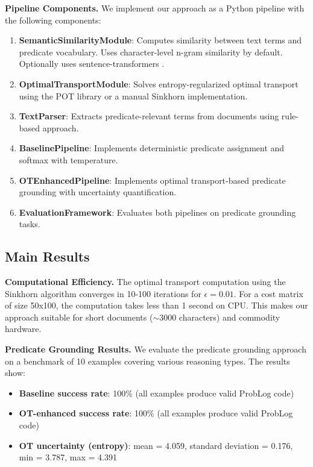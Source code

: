 \documentclass[11pt,letterpaper]{article}
\begin{document}
\textbf{Pipeline Components.} We implement our approach as a Python pipeline with the following components:

\begin{enumerate}
\item \textbf{SemanticSimilarityModule}: Computes similarity between text terms and predicate vocabulary. Uses character-level n-gram similarity by default. Optionally uses sentence-transformers \cite{Reimers2019}.

\item \textbf{OptimalTransportModule}: Solves entropy-regularized optimal transport using the POT library \cite{Flamary2022} or a manual Sinkhorn implementation.

\item \textbf{TextParser}: Extracts predicate-relevant terms from documents using rule-based approach.

\item \textbf{BaselinePipeline}: Implements deterministic predicate assignment and softmax with temperature.

\item \textbf{OTEnhancedPipeline}: Implements optimal transport-based predicate grounding with uncertainty quantification.

\item \textbf{EvaluationFramework}: Evaluates both pipelines on predicate grounding tasks.
\end{enumerate}

\subsection{Main Results}

\textbf{Computational Efficiency.} The optimal transport computation using the Sinkhorn algorithm converges in 10-100 iterations for $\epsilon = 0.01$. For a cost matrix of size 50x100, the computation takes less than 1 second on CPU. This makes our approach suitable for short documents ($\sim$3000 characters) and commodity hardware.

\textbf{Predicate Grounding Results.} We evaluate the predicate grounding approach on a benchmark of 10 examples covering various reasoning types. The results show:

\begin{itemize}[noitemsep]
\item \textbf{Baseline success rate}: 100\% (all examples produce valid ProbLog code)
\item \textbf{OT-enhanced success rate}: 100\% (all examples produce valid ProbLog code)
\item \textbf{OT uncertainty (entropy)}: mean = 4.059, standard deviation = 0.176, min = 3.787, max = 4.391
\end{itemize}
\end{document}
